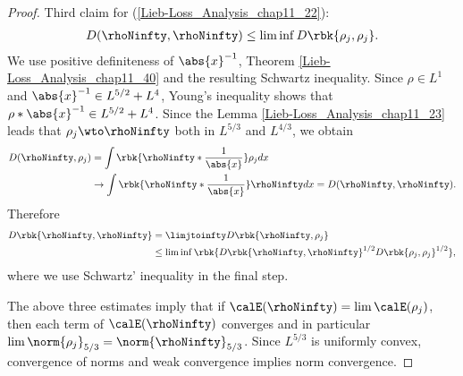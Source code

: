 \documentclass[openany, a4paper, oneside]{jsbook}
\begin{document}
\begin{proof}
Third claim for (\ref{Lieb-Loss_Analysis_chap11_22}):
\begin{align}
 D (\rhoNinfty, \rhoNinfty)
 \leq
 \liminf D \rbk{\rho_j, \rho_j}.
\end{align}
We use positive definiteness of $\abs{x}^{-1}$, Theorem \ref{Lieb-Loss_Analysis_chap11_40} and the resulting Schwartz inequality.
Since $\rho \in L^1$ and $\abs{x}^{-1} \in L^{5/2} + L^4$, Young's inequality shows that $\rho * \abs{x}^{-1} \in L^{5/2} + L^4$.
Since the Lemma \ref{Lieb-Loss_Analysis_chap11_23} leads that $\rho_j \wto \rhoNinfty$ both in $L^{5/3}$ and $L^{4/3}$,
we obtain
\begin{align}
 D (\rhoNinfty, \rho_j)
 &=
 \int \rbk{\rhoNinfty * \frac{1}{\abs{x}}} \rho_j dx \\
 &\to
 \int \rbk{\rhoNinfty * \frac{1}{\abs{x}}} \rhoNinfty dx
 =
 D (\rhoNinfty, \rhoNinfty).
\end{align}
Therefore
\begin{align}
 D \rbk{\rhoNinfty, \rhoNinfty}
 &=
 \limjtoinfty D \rbk{\rhoNinfty, \rho_j} \\
 &\leq
 \liminf \rbk{D\rbk{\rhoNinfty, \rhoNinfty}^{1/2} D \rbk{\rho_j, \rho_j}^{1/2}},
\end{align}
where we use Schwartz' inequality in the final step.

The above three estimates imply that if $\calE (\rhoNinfty) = \lim \calE (\rho_j)$, then each term of $\calE (\rhoNinfty)$
converges and in particular $\lim \norm{\rho_j}_{5/3} = \norm{\rhoNinfty}_{5/3}$.
Since $L^{5/3}$ is uniformly convex, convergence of norms and weak convergence implies norm convergence.
\end{proof}
\end{document}
